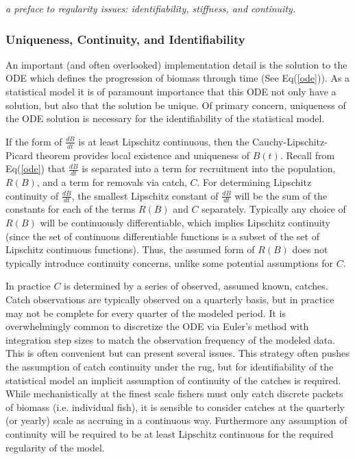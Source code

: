 \documentclass[12pt]{article}
\begin{document}
%

%
{\color{blue}

\textit{
a preface to regularity issues: identifiability, stiffness, and continuity.
}

%
\subsubsection{Uniqueness, Continuity, and Identifiability}

%
An important (and often overlooked) implementation detail is the solution to the
ODE which defines the progression of biomass through time (See Eq(\ref{ode})). As
a statistical model it is of paramount importance that this ODE not only have a
solution, but also that the solution be unique. Of primary concern, uniqueness
of the ODE solution is necessary for the identifiability of the statistical model.

%
If the form of $\frac{dB}{dt}$ is at least Lipschitz continuous, then the
Cauchy-Lipschitz-Picard theorem provides local existence and uniqueness of
$B(t)$.%
Recall from Eq(\ref{ode}) that $\frac{dB}{dt}$ is separated into
a term for recruitment into the population, $R(B)$, and a term for removals via
catch, $C$. For determining Lipschitz continuity of $\frac{dB}{dt}$,
the smallest Lipschitz constant of $\frac{dB}{dt}$ will be the sum of the
constants for each of the terms $R(B)$ and $C$ separately. Typically any choice
of $R(B)$ will be continuously differentiable, which implies Lipschitz continuity
(since the set of continuous differentiable functions is a subset of the set of
Lipschitz continuous functions).
Thus, the assumed form of $R(B)$ does not typically introduce continuity concerns,
unlike some potential assumptions for $C$.

%
In practice $C$ is determined by a series of observed, assumed
known, catches. Catch observations are typically observed on a quarterly basis, but
in practice may not be complete for every quarter of the modeled period. It is
overwhelmingly common to discretize the ODE via Euler's method with integration
step sizes to match the observation frequency of the modeled data. This is often
convenient but can present several issues. This strategy often pushes the
assumption of catch continuity under the rug, but for identifiability of the
statistical model an implicit assumption of continuity of the catches is
required. While mechanistically at the finest scale fishers must only catch
discrete packets of biomass (i.e. individual fish), it is sensible to consider
catches at the quarterly (or yearly) scale as accruing in a continuous way.
Furthermore any assumption of continuity will be required to be at least
Lipschitz continuous for the required regularity of the model.

}
\end{document}
